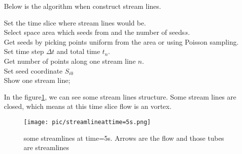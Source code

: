 \documentclass[
     11pt,         %
     a4paper,      %
     oneside,
     ]{article}
\begin{document}
	Below is the algorithm when construct stream lines.\\
	\begin{algorithm}[H]
		Set the time slice where stream lines would be.\\
		Select space area which seeds from and the number of seeds$s$.\\
		Get seeds by picking points uniform from the area or using Poisson sampling.\\ 
		Set time step $\Delta t$ and total time $t_{n}$. \\
		Get number of points along one stream line $n$.\\
		{
			Set seed coordinate $S_{i0}$\\
			Show one stream line;
			}
	\end{algorithm}
    In the figure\ref{fig:streamlineattime=5s}, we can see some stream lines structure. Some stream lines are closed, which means at this time slice flow is an vortex.
	\begin{figure}[H]
	\centering
	\texttt{[image: pic/streamlineattime=5s.png]}
	\caption{{\tiny some streamlines at time=5s. Arrows are the flow and those tubes are streamlines}}
	\label{fig:streamlineattime=5s}
	\end{figure}
	
\end{document}
